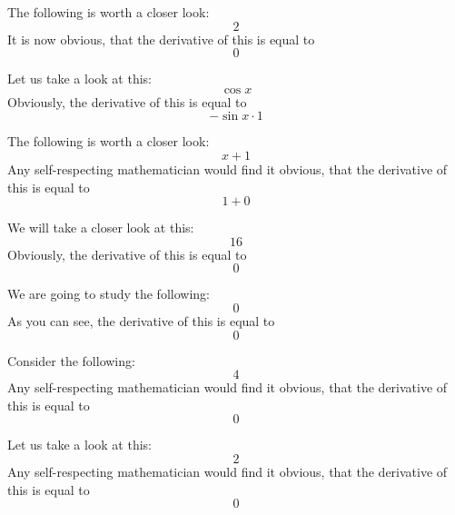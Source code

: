 \documentclass{article}
\begin{document}
The following is worth a closer look:
\begin{equation}
2 
\end{equation}
It is now obvious, that the derivative of this is equal to
\begin{equation}
0 
\end{equation}

Let us take a look at this:
\begin{equation}
\cos x 
\end{equation}
Obviously, the derivative of this is equal to
\begin{equation}
-\sin x \cdot 1 
\end{equation}

The following is worth a closer look:
\begin{equation}
x + 1 
\end{equation}
Any self-respecting mathematician would find it obvious, that the derivative of this is equal to
\begin{equation}
1 + 0 
\end{equation}

We will take a closer look at this:
\begin{equation}
16 
\end{equation}
Obviously, the derivative of this is equal to
\begin{equation}
0 
\end{equation}

We are going to study the following:
\begin{equation}
0 
\end{equation}
As you can see, the derivative of this is equal to
\begin{equation}
0 
\end{equation}

Consider the following:
\begin{equation}
4 
\end{equation}
Any self-respecting mathematician would find it obvious, that the derivative of this is equal to
\begin{equation}
0 
\end{equation}

Let us take a look at this:
\begin{equation}
2 
\end{equation}
Any self-respecting mathematician would find it obvious, that the derivative of this is equal to
\begin{equation}
0 
\end{equation}
\end{document}
